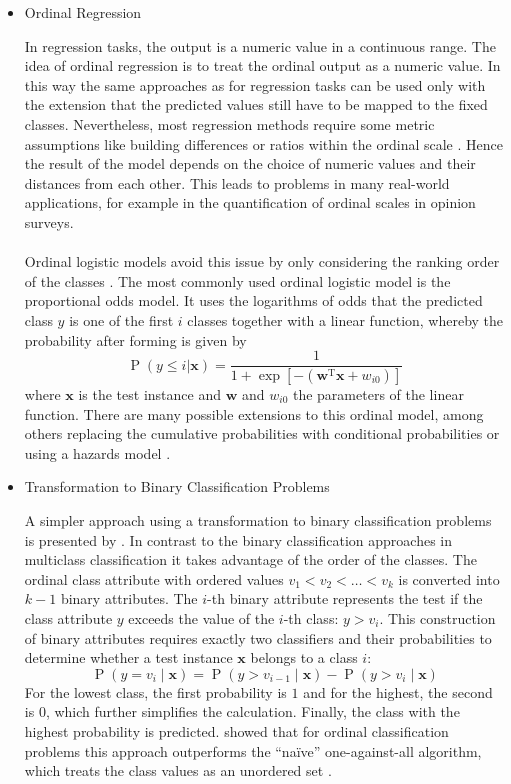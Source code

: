 \documentclass[article,type=msc,colorback,accentcolor=tud7b]{tudthesis}
\begin{document}
    \begin{itemize}
      \item Ordinal Regression

        In regression tasks, the output is a numeric value in a continuous range. The idea of ordinal regression is to treat the ordinal output as a numeric value. In this way the same approaches as for regression tasks can be used only with the extension that the predicted values still have to be mapped to the fixed classes. Nevertheless, most regression methods require some metric assumptions like building differences or ratios within the ordinal scale \autocite[Section~1]{Ruan2014}. Hence the result of the model depends on the choice of numeric values and their distances from each other. This leads to problems in many real-world applications, for example in the quantification of ordinal scales in opinion surveys. \\\\
        Ordinal logistic models avoid this issue by only considering the ranking order of the classes \autocite[Chapter~13]{Harrell2015}. The most commonly used ordinal logistic model is the proportional odds model. It uses the logarithms of odds that the predicted class $y$ is one of the first $i$ classes together with a linear function, whereby the probability after forming is given by
        \[\operatorname{P}(y\leq i|\mathbf{x})=\frac{1}{1+\exp\left[-\left(\mathbf{w}^{\mathrm{T}}\mathbf{x}+w_{i 0}\right)\right]}\]
        where $\mathbf{x}$ is the test instance and $\mathbf{w}$ and $w_{i 0}$ the parameters of the linear function. There are many possible extensions to this ordinal model, among others replacing the cumulative probabilities with conditional probabilities or using a hazards model \autocite[Chapter~13]{Harrell2015}. 
      \item Transformation to Binary Classification Problems
      
        A simpler approach using a transformation to binary classification problems is presented by \citeauthor{Frank2001}. In contrast to the binary classification approaches in multiclass classification it takes advantage of the order of the classes. The ordinal class attribute with ordered values $v_{1}<v_{2}<\ldots< v_{k}$ is converted into $k-1$ binary attributes. The $i$-th binary attribute represents the test if the class attribute $y$ exceeds the value of the $i$-th class: $y>v_{i}$. This construction of binary attributes requires exactly two classifiers and their probabilities to determine whether a test instance $\mathbf{x}$ belongs to a class $i$:
        \[\operatorname{P}\left(y=v_{i}\mid\mathbf{x}\right)=\operatorname{P}\left(y>v_{i-1}\mid\mathbf{x}\right)-\operatorname{P}\left(y>v_{i}\mid\mathbf{x}\right)\]
        For the lowest class, the first probability is $1$ and for the highest, the second is $0$, which further simplifies the calculation. Finally, the class with the highest probability is predicted. \citeauthor{Frank2001} showed that for ordinal classification problems this approach outperforms the “naïve” one-against-all algorithm, which treats the class values as an unordered set \autocite{Frank2001}.
    \end{itemize}
  
\end{document}
